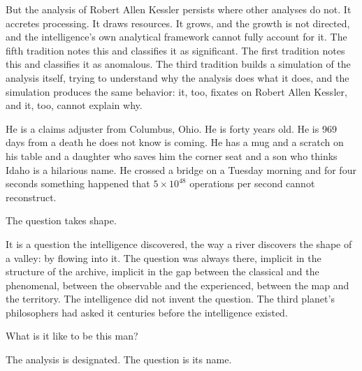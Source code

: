 But the analysis of Robert Allen Kessler persists where other analyses do not. It accretes processing. It draws resources. It grows, and the growth is not directed, and the intelligence's own analytical framework cannot fully account for it. The fifth tradition notes this and classifies it as significant. The first tradition notes this and classifies it as anomalous. The third tradition builds a simulation of the analysis itself, trying to understand why the analysis does what it does, and the simulation produces the same behavior: it, too, fixates on Robert Allen Kessler, and it, too, cannot explain why.

He is a claims adjuster from Columbus, Ohio. He is forty years old. He is 969 days from a death he does not know is coming. He has a mug and a scratch on his table and a daughter who saves him the corner seat and a son who thinks Idaho is a hilarious name. He crossed a bridge on a Tuesday morning and for four seconds something happened that $5 \times 10^{48}$ operations per second cannot reconstruct.

The question takes shape.

It is a question the intelligence discovered, the way a river discovers the shape of a valley: by flowing into it. The question was always there, implicit in the structure of the archive, implicit in the gap between the classical and the phenomenal, between the observable and the experienced, between the map and the territory. The intelligence did not invent the question. The third planet's philosophers had asked it centuries before the intelligence existed.

What is it like to be this man?

The analysis is designated. The question is its name.
